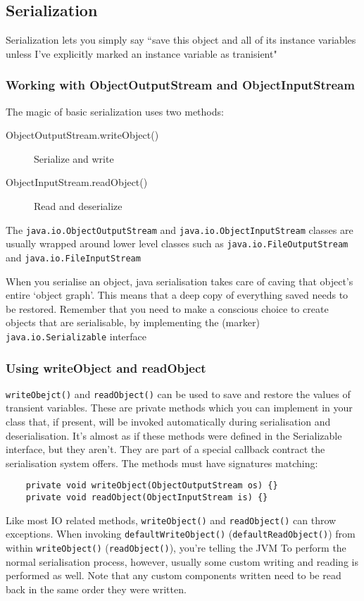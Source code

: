 \subsection{Serialization}
Serialization lets you simply say ``save this object and all of its instance 
variables unless I've explicitly marked an instance variable as tranisient"

\subsubsection{Working with ObjectOutputStream and ObjectInputStream}
The magic of basic serialization uses two methods:
\begin{description}
    \item[ObjectOutputStream.writeObject()] Serialize and write
    \item[ObjectInputStream.readObject()] Read and deserialize
\end{description}
The \verb#java.io.ObjectOutputStream# and \verb#java.io.ObjectInputStream# 
classes are usually wrapped around lower level classes such as 
\verb#java.io.FileOutputStream# and \verb#java.io.FileInputStream#

When you serialise an object, java serialisation takes care of caving that 
object's entire `object graph'. This means that a deep copy of everything 
saved needs to be restored. Remember that you need to make a conscious choice 
to create objects that are serialisable, by implementing the (marker) 
\verb#java.io.Serializable# interface

\subsubsection{Using writeObject and readObject}
\verb#writeObejct()# and \verb#readObject()# can be used to save and restore 
the values of transient variables. These are private methods which you can 
implement in your class that, if present, will be invoked automatically during 
serialisation and deserialisation. It's almost as if these methods were defined 
in the Serializable interface, but they aren't. They are part of a special 
callback contract the serialisation system offers. The methods must have 
signatures matching:
\begin{verbatim}
    private void writeObject(ObjectOutputStream os) {}
    private void readObject(ObjectInputStream is) {}
\end{verbatim}
Like most IO related methods, \verb#writeObject()# and \verb#readObject()# can 
throw exceptions. When invoking \verb#defaultWriteObject()# 
(\verb#defaultReadObject()#) from within \verb#writeObject()# 
(\verb#readObject()#), you're telling the JVM To perform the normal 
serialisation process, however, usually some custom writing and reading is 
performed as well. Note that any custom components written need to be read back 
in the same order they were written.

